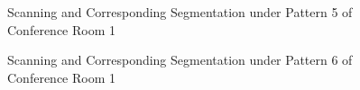 \documentclass[11pt, a4paper,oneside,chapterprefix=false]{scrbook}
\begin{document}
\begin{figure}[H]
    \centering
      \label{fig:conf1 5 occluded} \hfill
     \label{fig:conf1 5 seg}
    \caption{Scanning and Corresponding Segmentation under Pattern 5 of Conference Room 1}
    \label{fig:conf1 5 occ and seg}
\end{figure}

\begin{figure}[H]
    \centering
      \label{fig:conf1 6 occluded} \hfill
     \label{fig:conf1 6 seg}
    \caption{Scanning and Corresponding Segmentation under Pattern 6 of Conference Room 1}
    \label{fig:conf1 6 occ and seg}
\end{figure}
\end{document}
